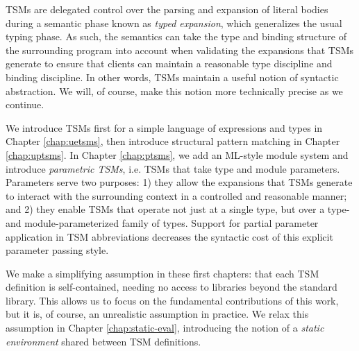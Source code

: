 TSMs are delegated control over the parsing and expansion of literal bodies during a semantic phase known as \emph{typed expansion}, which generalizes the usual typing phase. As such, the semantics can take the type and binding structure of the surrounding program into account when validating the expansions that TSMs generate to ensure that clients can maintain a reasonable type discipline and binding discipline. In other words, TSMs maintain a useful notion of syntactic abstraction. %
We will, of course, make this notion more technically precise as we continue.

We  introduce TSMs first for a simple language of expressions and types in Chapter \ref{chap:uetsms}, then introduce structural pattern matching  in Chapter \ref{chap:uptsms}. In Chapter \ref{chap:ptsms}, we add an ML-style module system and introduce \emph{parametric TSMs}, i.e. TSMs that take type and module parameters. Parameters serve two purposes: 1) they allow the expansions that TSMs generate to interact with the surrounding context in a controlled and reasonable manner; and 2) they enable TSMs that operate not just at a single type, but over a type- and module-parameterized family of types. Support for partial parameter application in TSM abbreviations decreases the syntactic cost of this explicit parameter passing style.

We make a simplifying assumption in these first chapters: that each TSM definition is self-contained, needing no access to libraries beyond the standard library. This allows us to focus on the fundamental contributions of this work, but it is, of course, an unrealistic assumption in practice. We relax this assumption in Chapter \ref{chap:static-eval}, introducing the notion of a \emph{static environment} shared between TSM definitions.

